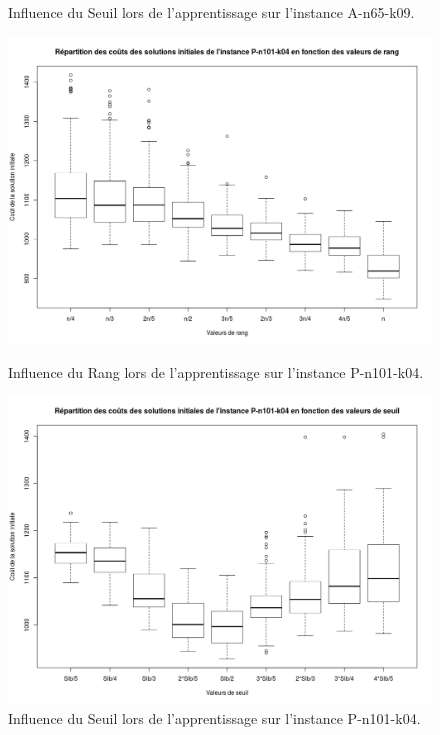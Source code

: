 \documentclass[a4paper,11pt]{article}%
\begin{document}
\begin{figure}
\begin{minipage}[c]{.46\linewidth}
        \caption{Influence du Seuil lors de l'apprentissage sur l'instance A-n65-k09.}
        \label{InfSA6509}
    \end{minipage}    
    
        \begin{minipage}[c]{.46\linewidth}
        \centering
        \includegraphics[scale=0.25]{InfluenceRangP10104}
        
        \caption{Influence du Rang lors de l'apprentissage sur l'instance P-n101-k04.}
        \label{InfRP10104}
    \end{minipage}
    \hfill%
    \begin{minipage}[c]{.46\linewidth}
        \centering
        \includegraphics[scale=0.25]{InfluenceSeuilP10104}
        
        \caption{Influence du Seuil lors de l'apprentissage sur l'instance P-n101-k04.}
        \label{InfSP10104}
    \end{minipage}
\end{figure}
\end{document}
